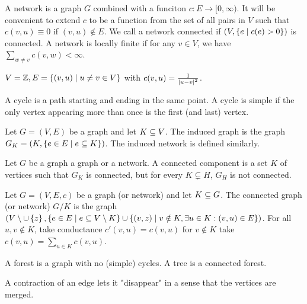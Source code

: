 \begin{defn}[Network]
  A network is a graph $G$ combined with a funciton $c:E\to [0,\infty)$. It will be convenient to extend $c$ to be a function from the set of all pairs in $V$ such that $c(v,u)\equiv 0$ if $(v,u)\notin E$. We call a network connected if $(V, \left\{ {e\; \vert \; c(e)>0} \right\})$ is connected. A network is locally finite if for any \(v\in V\), we have \(\sum_{w\neq v}c(v,w)<\infty\).  
\end{defn}


\begin{lem}[Example]
  $V=\mathbb{Z}, E= \left\{ {(v,u) \; \vert \; u\neq v\in V} \right\}$ with $c(v,u)=\frac{1}{\abs{u-v}^2}$.
\end{lem}


\begin{defn}[Cycle]
  A cycle is a path starting and ending in the same point. A cycle is simple if the only vertex appearing more than once is the first (and last) vertex.
\end{defn}


\begin{defn}
  Let $G=(V,E)$ be a graph and let \(K\subseteq V\). The induced graph is the graph \(G_K=(K, \left\{ {e\in E \; \vert \; e \subseteq K} \right\})\). The induced network is defined similarly. 
\end{defn}

\begin{defn}
    Let $G$ be a graph a graph or a network. A connected component is a set $K$ of vertices such that $G_K$ is connected, but for every $K\subsetneq H $, $G_H$ is not connected.
\end{defn}

\begin{defn}
  Let $G=(V,E,c)$ be a graph (or network) and let $K\subseteq G$. The connected graph (or network) $G/K$ is the graph $(V\setminus \cup \left\{ {z} \right\}, \left\{ {e \in E \; \vert \; e \subseteq V\setminus K} \right\} \cup \left\{ {(v,z) \; \vert \; v \notin K, \exists u \in K: (v,u) \in E} \right\})$. For all $u,v \notin K$, take conductance \(c'(v,u) = c(v,u)\) for $v\notin K$ take $c(v,u)=\sum_{u\in K} c(v,u)$.
\end{defn}


\begin{defn}
    A forest is a graph with no (simple) cycles. A tree is a connected forest.
\end{defn}


\begin{remark}
    A contraction of an edge lets it "disappear" in a sense that the vertices are merged.
\end{remark}


